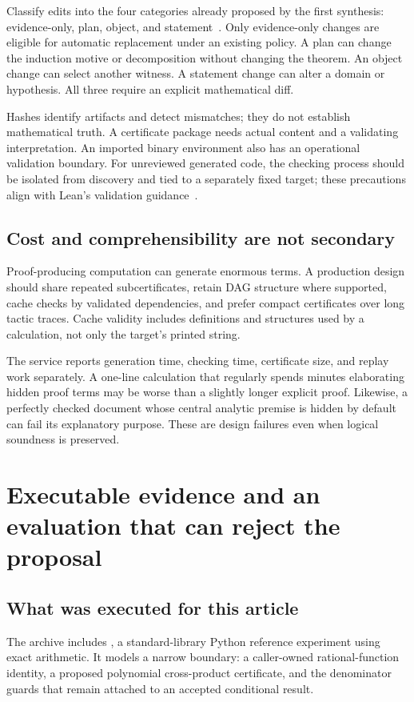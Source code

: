 \documentclass[11pt,a4paper]{article}
\newcommand{\code}[1]{\texttt{\detokenize{#1}}}
\theoremstyle{remark}\newtheorem{example}[proposition]{Example}
\begin{document}
Classify edits into the four categories already proposed by the first synthesis: evidence-only, plan, object, and statement~\cite{synthesis}. Only evidence-only changes are eligible for automatic replacement under an existing policy. A plan can change the induction motive or decomposition without changing the theorem. An object change can select another witness. A statement change can alter a domain or hypothesis. All three require an explicit mathematical diff.

Hashes identify artifacts and detect mismatches; they do not establish mathematical truth. A certificate package needs actual content and a validating interpretation. An imported binary environment also has an operational validation boundary. For unreviewed generated code, the checking process should be isolated from discovery and tied to a separately fixed target; these precautions align with Lean's validation guidance~\cite{validation}.

\subsection{Cost and comprehensibility are not secondary}
Proof-producing computation can generate enormous terms. A production design should share repeated subcertificates, retain DAG structure where supported, cache checks by validated dependencies, and prefer compact certificates over long tactic traces. Cache validity includes definitions and structures used by a calculation, not only the target's printed string.

The service reports generation time, checking time, certificate size, and replay work separately. A one-line calculation that regularly spends minutes elaborating hidden proof terms may be worse than a slightly longer explicit proof. Likewise, a perfectly checked document whose central analytic premise is hidden by default can fail its explanatory purpose. These are design failures even when logical soundness is preserved.

\section{Executable evidence and an evaluation that can reject the proposal}\label{sec:experiment}
\subsection{What was executed for this article}
The archive includes , a standard-library Python reference experiment using exact \code{Fraction} arithmetic. It models a narrow boundary: a caller-owned rational-function identity, a proposed polynomial cross-product certificate, and the denominator guards that remain attached to an accepted conditional result.
\end{document}
